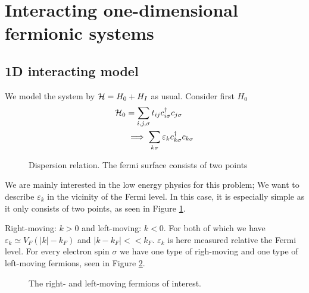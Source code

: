 \section{Interacting one-dimensional fermionic systems}

\subsection[Model]{1D interacting model}

We model the system by $\mathcal{H} = H_0 + H_I$ as usual. Consider first $H_0$
\begin{align*}
	\mathcal{H}_0 &= \sum_{i,j,\sigma}t_{ij}c^{\dagger}_{i\sigma}c_{j\sigma} \\
	&\implies \sum_{k \sigma}\varepsilon_kc^{\dagger}_{k\sigma}c_{k\sigma}
\end{align*}

\begin{figure}
	\centering
	
	\caption{Dispersion relation. The fermi surface consists of two points}
	\label{fig:disp_rel}
\end{figure}

We are mainly interested in the low energy physics for this problem; We want to describe $\varepsilon_k$ in the vicinity of the Fermi level. In this case, it is especially simple as it only consists of two points, as seen in Figure \ref{fig:disp_rel}.

Right-moving: $k>0$ and left-moving: $k<0$. For both of which we have  $\varepsilon_k\simeq V_F(|k| - k_F)$ and $|k-k_F|<<k_F$. $\varepsilon_k$ is here measured relative the Fermi level.
For every electron spin $\sigma$ we have one type of righ-moving and one type of left-moving fermions, seen in Figure \ref{fig:lr_fermions}.

\begin{figure}
	\centering
	
	\caption{The right- and left-moving fermions of interest.}
	\label{fig:lr_fermions}
\end{figure}

